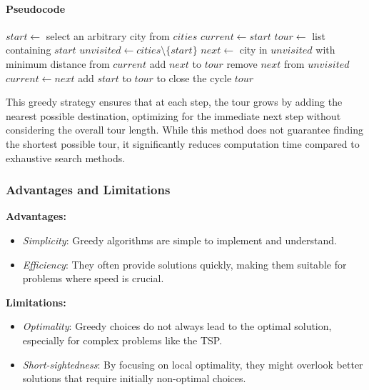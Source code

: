 
\paragraph{Pseudocode}

\begin{algorithm}
	\caption{TSP \Gls{NNS}}\label{alg:greedybestfirst}
	\begin{algorithmic}[1]
		\State $start \gets$ select an arbitrary city from $cities$
		\State $current \gets start$
		\State $tour \gets$ list containing $start$
		\State $unvisited \gets cities \setminus \{start\}$
		\State $next \gets$ city in $unvisited$ with minimum distance from $current$
		\State add $next$ to $tour$
		\State remove $next$ from $unvisited$
		\State $current \gets next$
		\EndWhile
		\State add $start$ to $tour$ to close the cycle
		\State \Return $tour$
		\EndProcedure
	\end{algorithmic}
\end{algorithm}

This greedy strategy ensures that at each step, the tour grows by adding the nearest possible destination, optimizing for the immediate next step without considering the overall tour length. While this method does not guarantee finding the shortest possible tour, it significantly reduces computation time compared to exhaustive search methods.


\subsubsection{Advantages and Limitations}

\textbf{Advantages:}
\begin{itemize}
	\item \textit{Simplicity}: Greedy algorithms are simple to implement and understand.
	\item \textit{Efficiency}: They often provide solutions quickly, making them suitable for problems where speed is crucial.
\end{itemize}

\textbf{Limitations:}
\begin{itemize}
	\item \textit{Optimality}: Greedy choices do not always lead to the optimal solution, especially for complex problems like the \Gls{TSP}.
	\item \textit{Short-sightedness}: By focusing on local optimality, they might overlook better solutions that require initially non-optimal choices.
\end{itemize}

